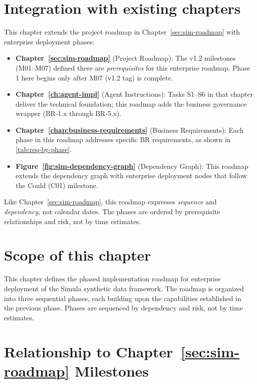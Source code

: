 \documentclass[12pt,a4paper,twoside]{report}
\begin{document}
\section*{Integration with existing chapters}

This chapter extends the project roadmap in Chapter~\ref{sec:sim-roadmap} with
enterprise deployment phases:

\begin{itemize}
\item \textbf{Chapter~\ref{sec:sim-roadmap}} (Project Roadmap): The v1.2
milestones (M01--M07) defined there are \emph{prerequisites} for this
enterprise roadmap. Phase 1 here begins only after M07 (v1.2 tag) is complete.
\item \textbf{Chapter~\ref{ch:agent-impl}} (Agent Instructions): Tasks S1--S6
in that chapter deliver the technical foundation; this roadmap adds the
business governance wrapper (BR-1.x through BR-5.x).
\item \textbf{Chapter~\ref{chap:business-requirements}} (Business Requirements):
Each phase in this roadmap addresses specific BR requirements, as shown in
\cref{tab:req-by-phase}.
\item \textbf{Figure~\ref{fig:sim-dependency-graph}} (Dependency Graph): This
roadmap extends the dependency graph with enterprise deployment nodes that
follow the Could (C01) milestone.
\end{itemize}

\noindent
Like Chapter~\ref{sec:sim-roadmap}, this roadmap expresses \emph{sequence} and
\emph{dependency}, not calendar dates. The phases are ordered by prerequisite
relationships and risk, not by time estimates.

\section*{Scope of this chapter}

This chapter defines the phased implementation roadmap for enterprise deployment
of the Simula synthetic data framework. The roadmap is organized into three
sequential phases, each building upon the capabilities established in the
previous phase. Phases are sequenced by dependency and risk, not by time
estimates.

\section*{Relationship to Chapter~\ref{sec:sim-roadmap} Milestones}
\end{document}
